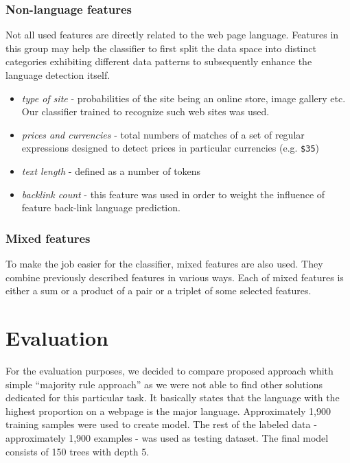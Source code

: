 \documentclass{acm_proc_article-sp}
\begin{document}
{ \subsubsection{Non-language features}
    Not all used features are directly related to the web page language. Features in this group may help the
    classifier to first split the data space into distinct categories exhibiting different data patterns 
    to subsequently enhance the language detection itself.

    \begin{itemize}
      \item \textit{type of site} - probabilities of the site being an online store, image gallery etc.
      Our classifier trained to recognize such web sites was used.
      \item \textit{prices and currencies} - total numbers of matches of a set of regular
      expressions designed to detect prices in particular currencies (e.g. \texttt{\$35}) 
      \item \textit{text length} - defined as a number of tokens
      \item \textit{backlink count} - this feature was used in order to weight the influence of feature
      back-link language prediction.
    \end{itemize}

  \subsubsection{Mixed features}
    To make the job easier for the classifier, mixed features are also used. They combine previously
    described features in various ways. Each of mixed features is either a sum or a product of a
    pair or a triplet of some selected features. 

    \section{Evaluation}
 For the evaluation purposes, we decided to compare proposed approach whith simple ``majority rule approach'' \cite{Martins:langidentweb} as we were 
 not able to find other solutions dedicated for this particular task. It basically states that the language with the highest proportion on a webpage
 is the major language. Approximately 1,900 training samples were used to create model. 
 The rest of the labeled data - approximately 1,900 examples - was used as testing dataset.
 The final model consists of 150 trees with depth 5.
 

}
\end{document}
